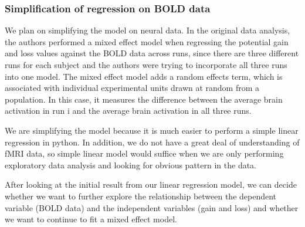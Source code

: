 \subsubsection{Simplification of regression on BOLD data}

\indent \indent We plan on simplifying the model on neural data. In the 
original data analysis, the authors performed a mixed effect model when 
regressing the potential gain and loss values against the BOLD data across 
runs, since there are three different runs for each subject and the authors 
were trying to incorporate all three runs into one model. The mixed effect 
model adds a random effects term, which is associated with individual 
experimental units drawn at random from a population. In this case, it 
measures the difference between the average brain activation in run i and the 
average brain activation in all three runs.

We are simplifying the model because it is much easier to perform a simple 
linear regression in python. In addition, we do not have a great deal of 
understanding of fMRI data, so simple linear model would suffice when we are 
only performing exploratory data analysis and looking for obvious pattern in 
the data.

After looking at the initial result from our linear regression model, we can 
decide whether we want to further explore the relationship between the 
dependent variable (BOLD data) and the independent variables (gain and loss) 
and whether we want to continue to fit a mixed effect model.
